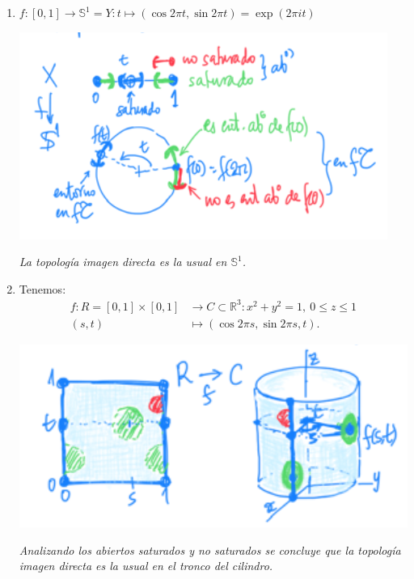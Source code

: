 \begin{ej}
\begin{enumerate}
    \item $f: \left[ 0, 1 \right] \rightarrow \mathbb{S}^1 = Y: t \mapsto \left( \cos 2\pi t, \sin 2\pi t \right) = \exp\left( 2 \pi i t \right)$
    \begin{center}
        \includegraphics[scale=0.4]{images/ej_sat_1} 

        \textit{La topología imagen directa es la usual en $\mathbb{S}^1$.} 
    \end{center}

    \item Tenemos:
    \begin{align*}
        f: R = \left[ 0, 1 \right] \times \left[ 0, 1 \right] &\rightarrow C \subset \mathbb{R}^3: x^2 + y^2 = 1,\ 0 \le z \le 1\\
        \left( s, t \right) &\mapsto \left( \cos 2\pi s, \sin 2\pi s, t \right) 
    .\end{align*}

    \begin{center}
        \includegraphics[scale=0.3]{images/ej_top_dir_2}

        \textit{Analizando los abiertos saturados y no saturados se concluye que la topología imagen directa es la usual en el tronco del cilindro.} 
    \end{center}
\end{enumerate}
\end{ej}

